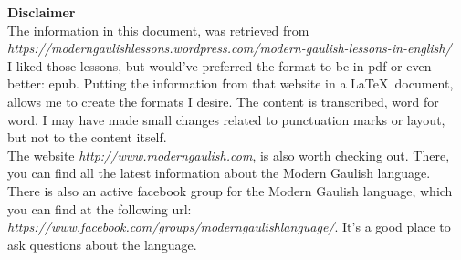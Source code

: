 \begin{center}
\textbf{Disclaimer}\\
\bigskip
\noindent The information in this document, was retrieved from \textit{https://moderngaulishlessons.wordpress.com/modern-gaulish-lessons-in-english/}\\
\bigskip
\noindent I liked those lessons, but would've preferred the format to be in pdf or even better: epub. Putting the information from that website in a \LaTeX\ document, allows me to create the formats I desire. The content is transcribed, word for word. I may have made small changes related to punctuation marks or layout, but not to the content itself.\\
\bigskip
\noindent The website \textit{http://www.moderngaulish.com}, is also worth checking out. There, you can find all the latest information about the Modern Gaulish language.\\
\bigskip
\noindent There is also an active facebook group for the Modern Gaulish language, which you can find at the following url: \textit{https://www.facebook.com/groups/moderngaulishlanguage/}. It's a good place to ask questions about the language.
\end{center}
